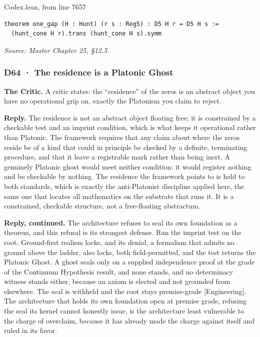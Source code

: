 \documentclass[10pt,twocolumn]{article}
\begin{document}
\begin{leanexcerpt}{Codex.lean, from line 7657}
\begin{lstlisting}[style=leanx,firstnumber=7657]
theorem one_gap (H : Hunt) (r s : Reg5) : D5 H r ↔ D5 H s :=
  (hunt_cone H r).trans (hunt_cone H s).symm
\end{lstlisting}
\end{leanexcerpt}

\emph{Source: Master Chapter 25, §12.5.}

\hypertarget{d64-the-residence-is-a-platonic-ghost}{%
\subsubsection{D64 · The residence is a Platonic
Ghost}\label{d64-the-residence-is-a-platonic-ghost}}

\textbf{The Critic.} A critic states: the ``residence'' of the zeros is
an abstract object you have no operational grip on, exactly the
Platonism you claim to reject.

\textbf{Reply.} The residence is not an abstract object floating free;
it is constrained by a checkable test and an imprint condition, which is
what keeps it operational rather than Platonic. The framework requires
that any claim about where the zeros reside be of a kind that could in
principle be checked by a definite, terminating procedure, and that it
leave a registrable mark rather than being inert. A genuinely Platonic
ghost would meet neither condition: it would register nothing and be
checkable by nothing. The residence the framework points to is held to
both standards, which is exactly the anti-Platonist discipline applied
here, the same one that locates all mathematics on the substrate that
runs it. It is a constrained, checkable structure, not a free-floating
abstractum.

\textbf{Reply, continued.} The architecture refuses to seal its own
foundation as a theorem, and this refusal is its strongest defense. Run
the imprint test on the root. Ground-first realism locks, and its
denial, a formalism that admits no ground above the ladder, also locks,
both field-permitted, and the test returns the Platonic Ghost. A ghost
seals only on a supplied independence proof at the grade of the
Continuum Hypothesis result, and none stands, and no determinacy witness
stands either, because an axiom is elected and not grounded from
elsewhere. The seal is withheld and the root stays premise-grade
{[}Engineering{]}. The architecture that holds its own foundation open
at premise grade, refusing the seal its kernel cannot honestly issue, is
the architecture least vulnerable to the charge of overclaim, because it
has already made the charge against itself and ruled in its favor.
\end{document}

